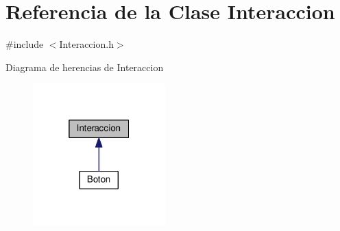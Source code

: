 \hypertarget{classInteraccion}{}\section{Referencia de la Clase Interaccion}
\label{classInteraccion}


{\ttfamily \#include $<$Interaccion.\+h$>$}



Diagrama de herencias de Interaccion
\nopagebreak
\begin{figure}[H]
\begin{center}
\leavevmode
\includegraphics[width=145pt]{classInteraccion__inherit__graph}
\end{center}
\end{figure}

